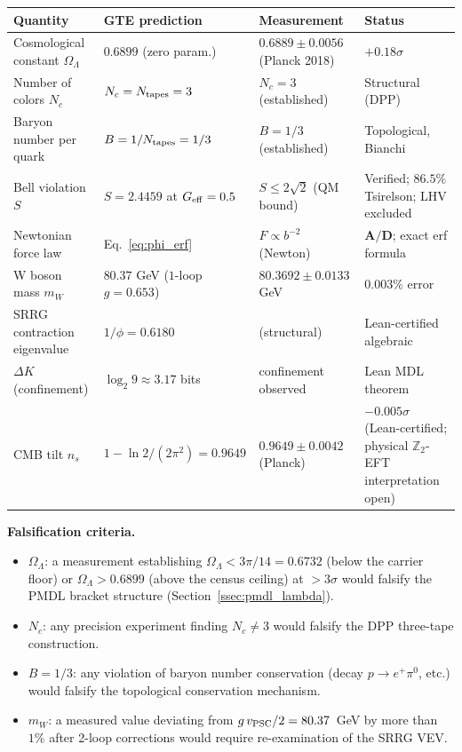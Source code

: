 \documentclass[11pt]{article}
\theoremstyle{remark}
\newcommand{\OmegaL}{\Omega_\Lambda}
\newcommand{\CatAD}{\textbf{A/D}}
\begin{document}
\begin{center}
\begin{longtable}{P{4cm}P{3cm}P{3cm}P{3cm}}
\toprule
\textbf{Quantity} & \textbf{GTE prediction} & \textbf{Measurement} & \textbf{Status}\\
\midrule
\endhead
Cosmological constant $\OmegaL$
  & $0.6899$ (zero param.)
  & $0.6889\pm0.0056$ (Planck 2018)
  & $+0.18\sigma$\\[4pt]
Number of colors $N_c$
  & $N_c = N_{\rm tapes} = 3$
  & $N_c = 3$ (established)
  & Structural (DPP)\\[4pt]
Baryon number per quark
  & $B = 1/N_{\rm tapes} = 1/3$
  & $B = 1/3$ (established)
  & Topological, Bianchi\\[4pt]
Bell violation $S$
  & $S = 2.4459$ at $G_{\rm eff}=0.5$
  & $S\le 2\sqrt{2}$ (QM bound)
  & Verified; $86.5\%$ Tsirelson; LHV excluded\\[4pt]
Newtonian force law
  & Eq.~\eqref{eq:phi_erf}
  & $F\propto b^{-2}$ (Newton)
  & $\CatAD$; exact erf formula\\[4pt]
W boson mass $m_W$
  & $80.37$ GeV ($1$-loop $g=0.653$)
  & $80.3692\pm 0.0133$ GeV
  & $0.003\%$ error\\[4pt]
SRRG contraction eigenvalue
  & $1/\phi = 0.6180$
  & (structural)
  & Lean-certified algebraic\\[4pt]
$\Delta K$ (confinement)
  & $\log_2 9 \approx 3.17$ bits
  & confinement observed
  & Lean MDL theorem\\[4pt]
CMB tilt $n_s$
  & $1 - \ln 2/(2\pi^2) = 0.9649$
  & $0.9649\pm 0.0042$ (Planck)
  & $-0.005\sigma$ (Lean-certified; physical $\mathbb{Z}_2$-EFT interpretation open)\\
\bottomrule
\end{longtable}
\end{center}

\medskip
\noindent\textbf{Falsification criteria.}
\begin{itemize}[itemsep=2pt]
\item $\OmegaL$: a measurement establishing $\OmegaL < 3\pi/14 = 0.6732$ (below
      the carrier floor) or $\OmegaL > 0.6899$ (above the census ceiling) at
      $>3\sigma$ would falsify the PMDL bracket structure
      (Section~\ref{ssec:pmdl_lambda}).
\item $N_c$: any precision experiment finding $N_c \neq 3$ would falsify the DPP
      three-tape construction.
\item $B = 1/3$: any violation of baryon number conservation (decay $p\to e^+\pi^0$,
      etc.) would falsify the topological conservation mechanism.
\item $m_W$: a measured value deviating from $g\,v_{\rm PSC}/2 = 80.37$~GeV by
      more than $1\%$ after 2-loop corrections would require re-examination of
      the SRRG VEV.
\end{itemize}
\end{document}

